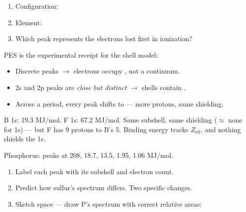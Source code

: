 \documentclass{apchem-notes}
\begin{document}
\begin{enumerate}[leftmargin=*,itemsep=0.4em]
  \item Configuration: 
  \item Element: 
  \item Which peak represents the electrons lost first in ionization?
\end{enumerate}



PES is the experimental receipt for the shell model:
\begin{itemize}[leftmargin=*,itemsep=0.25em]
  \item Discrete peaks $\to$ electrons occupy , not a continuum.
  \item 2s and 2p peaks are \emph{close but distinct} $\to$ shells contain
        .
  \item Across a period, every peak shifts to 
        --- more protons, same shielding.
\end{itemize}

\begin{workedexample}
B 1s: 19.3 MJ/mol. F 1s: 67.2 MJ/mol. Same subshell, same shielding
($\approx$ none for 1s) --- but F has 9 protons to B's 5. Binding energy
tracks $Z_{\text{eff}}$, and nothing shields the 1s.
\end{workedexample}


Phosphorus: peaks at 208, 18.7, 13.5, 1.95, 1.06 MJ/mol.

\begin{enumerate}[leftmargin=*,itemsep=0.4em]
  \item Label each peak with its subshell and electron count.
  \item Predict how sulfur's spectrum differs. Two specific changes.
  \item Sketch space --- draw P's spectrum with correct relative areas:
        \workspace[3.2cm]
\end{enumerate}
\end{document}

